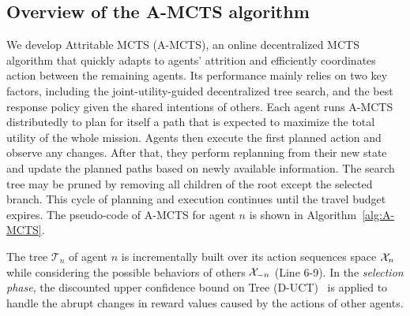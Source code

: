 \subsection{Overview of the A-MCTS algorithm}
\label{sec:attritable}
We develop Attritable MCTS (A-MCTS), an online decentralized MCTS algorithm that quickly adapts to agents' attrition and efficiently coordinates action between the remaining agents. Its performance mainly relies on two key factors, including the joint-utility-guided decentralized tree search, and the best response policy given the shared intentions of others.
Each agent runs A-MCTS distributedly to plan for itself a path that is expected to maximize the total utility of the whole mission. Agents then execute the first planned action and observe any changes. After that, they perform replanning from their new state and update the planned paths based on newly available information. The search tree may be pruned by removing all children of the root except the selected branch. This cycle of planning and execution continues until the travel budget expires.
The pseudo-code of A-MCTS for agent $n$ is shown in Algorithm~\ref{alg:A-MCTS}.

The tree $\mathcal{T}_n$ of agent $n$ is incrementally built over its action sequences space $\mathcal{X}_n$ while considering the possible behaviors of others $\mathcal{X}_{-n}$ (Line 6-9). In the \emph{selection phase}, the discounted upper confidence bound on Tree (D-UCT)~\citep{best2019dec} is applied to handle the abrupt changes in reward values caused by the actions of other agents.

